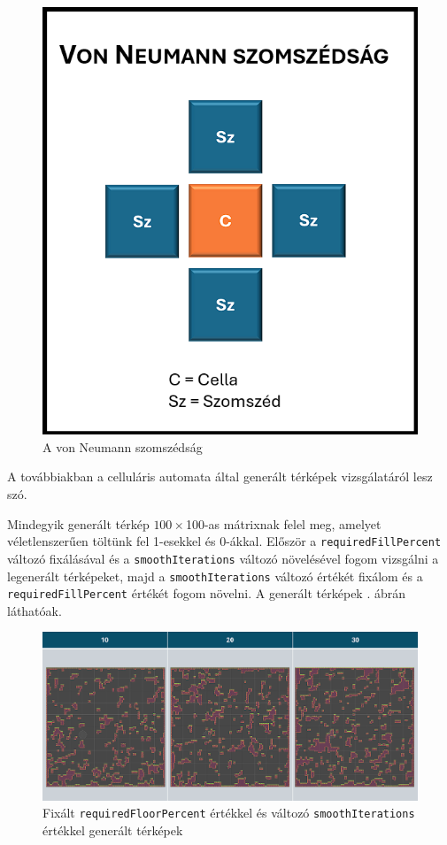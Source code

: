 \begin{figure}[ht]
\centering
\includegraphics[scale = 0.4]{images/vonNeumann.png}
\caption{A von Neumann szomszédság}
\label{fig:vonNeumann}
\end{figure}

A továbbiakban a celluláris automata által generált térképek vizsgálatáról lesz szó.

Mindegyik generált térkép $100 \times $100-as mátrixnak felel meg, amelyet véletlenszerűen töltünk fel 1-esekkel és 0-ákkal. Először a \texttt{requiredFillPercent} változó fixálásával és a \texttt{smoothIterations} változó növelésével fogom vizsgálni a legenerált térképeket, majd a \texttt{smoothIterations} változó értékét fixálom és a \texttt{requiredFillPercent} értékét fogom növelni. A generált térképek . ábrán láthatóak.

\begin{figure}[ht]
\centering
\includegraphics[width=\textwidth]{images/fixedpercentcellular.png}
\caption{Fixált \texttt{requiredFloorPercent} értékkel és változó \texttt{smoothIterations} értékkel generált térképek}
\label{fig:fixedPercentCellular}
\end{figure}

